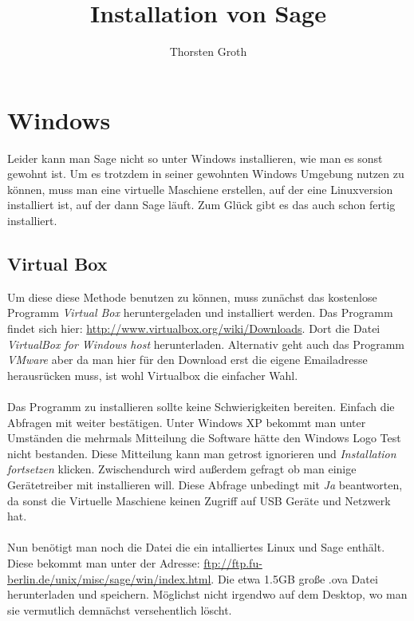 \documentclass[a4paper,10pt]{article}
\title{Installation von Sage}
\author{Thorsten Groth}
\begin{document}
\maketitle
\section{Windows}
Leider kann man Sage nicht so unter Windows installieren, wie man es sonst gewohnt ist. Um es trotzdem in seiner gewohnten Windows
Umgebung nutzen zu können, muss man eine virtuelle Maschiene erstellen, auf der eine Linuxversion installiert ist, auf der dann 
Sage läuft. 
Zum Glück gibt es das auch schon fertig installiert. 

\subsection{Virtual Box}
Um diese diese Methode benutzen zu können, muss zunächst das kostenlose Programm \emph{Virtual Box} heruntergeladen und installiert werden. 
Das Programm findet sich hier: \url{http://www.virtualbox.org/wiki/Downloads}. Dort die Datei \emph{VirtualBox for Windows host} herunterladen.
Alternativ geht auch das Programm \emph{VMware} aber 
da man hier für den Download erst die eigene Emailadresse herausrücken muss, ist wohl Virtualbox die einfacher Wahl.
\paragraph{}
Das Programm zu installieren sollte keine Schwierigkeiten bereiten. Einfach die Abfragen mit weiter bestätigen. Unter Windows XP bekommt
man unter Umständen die mehrmals Mitteilung die Software hätte den Windows Logo Test nicht bestanden. Diese Mitteilung kann man 
getrost ignorieren und \emph{Installation fortsetzen} klicken. Zwischendurch wird außerdem gefragt ob man einige Gerätetreiber mit installieren will.
Diese Abfrage unbedingt mit \emph{Ja} beantworten, da sonst die Virtuelle Maschiene keinen Zugriff auf USB Geräte und Netzwerk hat.
\paragraph{}
 Nun benötigt man noch die Datei die ein intalliertes Linux und Sage enthält. Diese bekommt man unter der Adresse:
 \url{ftp://ftp.fu-berlin.de/unix/misc/sage/win/index.html}. Die etwa 1.5GB große .ova Datei herunterladen und speichern.
Möglichst nicht irgendwo auf dem Desktop, wo man sie vermutlich demnächst versehentlich löscht. 
\paragraph{}
\end{document}
